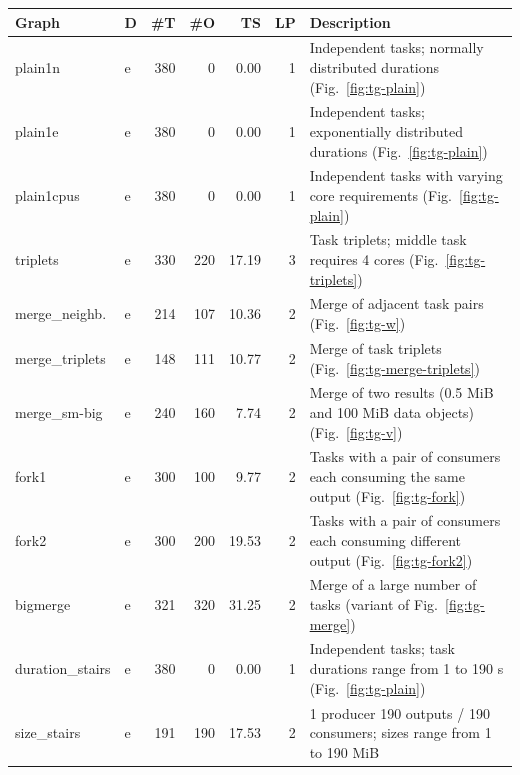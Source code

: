 \begin{table}
	\centering
	\begin{tabular}{l|lrrrr|T}
		\toprule
		Graph            & D & \#T & \#O   & TS     & LP  & \normalsize{Description}     \\
		\midrule
		plain1n          & e & 380 & 0     & 0.00   & 1   & Independent tasks;
		normally distributed durations (Fig.~\ref{fig:tg-plain})                         \\
		plain1e          & e & 380 & 0     & 0.00   & 1   & Independent tasks;
		exponentially distributed durations (Fig.~\ref{fig:tg-plain})                    \\
		plain1cpus       & e & 380 & 0     & 0.00   & 1   & Independent tasks with
		varying core requirements (Fig.~\ref{fig:tg-plain})                              \\
		triplets         & e & 330 & 220   & 17.19  & 3   & Task triplets; middle
		task requires 4 cores (Fig.~\ref{fig:tg-triplets})                               \\
		merge\_neighb.   & e & 214 & 107   & 10.36  & 2   & Merge of adjacent
		task pairs (Fig.~\ref{fig:tg-w})                                                 \\
		merge\_triplets  & e & 148 & 111   & 10.77  & 2   & Merge of task
		triplets (Fig.~\ref{fig:tg-merge-triplets})                                      \\
		merge\_sm-big    & e & 240 & 160   & 7.74   & 2   & Merge of two
		results (0.5 MiB and 100 MiB data objects) (Fig.~\ref{fig:tg-v})                 \\
		fork1            & e & 300 & 100   & 9.77   & 2   & Tasks with a pair of
		consumers each consuming the same output (Fig.~\ref{fig:tg-fork})                \\
		fork2            & e & 300 & 200   & 19.53  & 2   & Tasks with a pair of
		consumers each consuming different output (Fig.~\ref{fig:tg-fork2})              \\
		bigmerge         & e & 321 & 320   & 31.25  & 2   & Merge of a large
		number of tasks (variant of Fig.~\ref{fig:tg-merge})                             \\
		duration\_stairs & e & 380 & 0     & 0.00   & 1   & Independent
		tasks; task durations range from 1 to 190 s (Fig.~\ref{fig:tg-plain})            \\
		size\_stairs     & e & 191 & 190   & 17.53  & 2   & 1 producer 190
		outputs / 190 consumers; sizes range from 1 to 190 MiB                           \\

\end{tabular}
\end{table}
